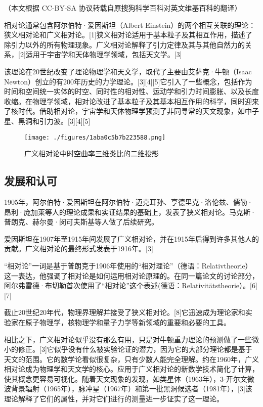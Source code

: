 
（本文根据 CC-BY-SA 协议转载自原搜狗科学百科对英文维基百科的翻译）


相对论通常包含阿尔伯特·爱因斯坦（Albert Einstein）的两个相互关联的理论：狭义相对论和广义相对论。[1]狭义相对论适用于基本粒子及其相互作用，描述了除引力以外的所有物理现象。广义相对论解释了引力定律及其与其他自然力的关系，[2]适用于宇宙学和天体物理学领域，包括天文学。[3]

该理论在20世纪改变了理论物理学和天文学，取代了主要由艾萨克·牛顿（Isaac Newton）创立的有200年历史的力学理论。[3][4][5]它引入了一些概念，包括作为时间和空间统一实体的时空、同时性的相对性、运动学和引力时间膨胀、以及长度收缩。在物理学领域，相对论改进了基本粒子及其基本相互作用的科学，同时迎来了核时代。借助相对论，宇宙学和天体物理学预测了非同寻常的天文现象，如中子星、黑洞和引力波。[3][4][5]

\begin{figure}[ht]
\centering
\texttt{[image: ./figures/1aba0c5b7b223588.png]}
\caption{广义相对论中时空曲率三维类比的二维投影} \label{fig_XDL_1}
\end{figure}

\subsection{发展和认可}

1905年，阿尔伯特·爱因斯坦在阿尔伯特·迈克耳孙、亨德里克·洛伦兹、儒勒·昂利·庞加莱等人的理论成果和实证结果的基础上，发表了狭义相对论。马克斯·普朗克、赫尔曼·闵可夫斯基等人做了后续研究。

爱因斯坦在1907年至1915年间发展了广义相对论，并在1915年后得到许多其他人的贡献。广义相对论的最终形式发表于1916年。[3]

“相对论”一词是基于普朗克于1906年使用的“相对理论”（德语：Relativtheorie）这一表达，他强调了相对论是如何运用相对论原理的。在同一篇论文的讨论部分，阿尔弗雷德·布切勒首次使用了“相对论”这个表述(德语：Relativitätstheorie）。[6][7]

截止20世纪20年代，物理界理解并接受了狭义相对论。[8]它迅速成为理论家和实验家在原子物理学，核物理学和量子力学等新领域的重要和必要的工具。

相比之下，广义相对论似乎没有那么有用，只是对牛顿重力理论的预测做了一些微小的修正。[3]它似乎没有什么被实验论证的潜力，因为它的大部分理论都是基于天文的范围。它的数学论看似很复杂，只有少数人能完全理解。约在1960年，广义相对论成为物理学和天文学的核心。应用于广义相对论的新数学技术简化了计算，使其概念更容易可视化。随着天文现象的发现，如类星体（1963年），3-开尔文微波背景辐射（1965年），脉冲星（1967年）和第一批黑洞候选者（1981年），[3]该理论解释了它们的属性，并对它们进行的测量进一步证实了这一理论。

